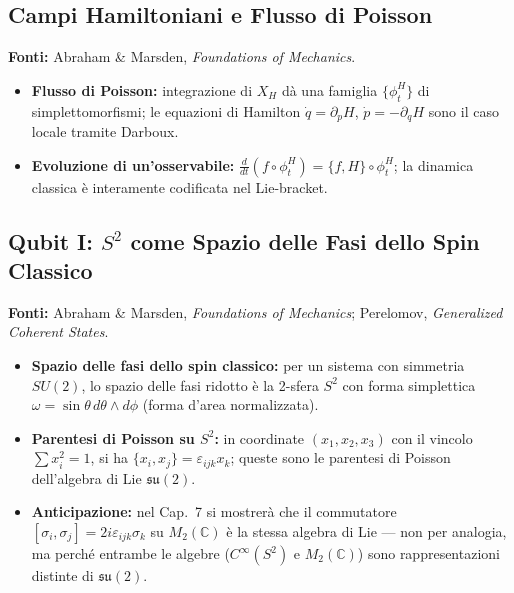 \documentclass[12pt, a4paper]{article}
\newcommand{\fonti}[1]{%
	\begin{fontebox}
		\textcolor{fontecolor}{\footnotesize\textbf{Fonti:} #1}
	\end{fontebox}%
}
\begin{document}
	\subsection{Campi Hamiltoniani e Flusso di Poisson}
	
	\fonti{Abraham \& Marsden, \textit{Foundations of Mechanics}.}
	
	\begin{itemize}
		\item \textbf{Flusso di Poisson:} integrazione di $X_H$ dà una famiglia $\{\phi_t^H\}$
		di simplettomorfismi; le equazioni di Hamilton $\dot{q} = \partial_p H$,
		$\dot{p} = -\partial_q H$ sono il caso locale tramite Darboux.
		\item \textbf{Evoluzione di un'osservabile:} $\frac{d}{dt}(f \circ \phi_t^H) =
		\{f, H\} \circ \phi_t^H$; la dinamica classica è interamente codificata nel
		Lie-bracket.
	\end{itemize}
	
	\subsection{Qubit I: $S^2$ come Spazio delle Fasi dello Spin Classico}
	\label{sec:qubit1}
	
	\fonti{Abraham \& Marsden, \textit{Foundations of Mechanics}; Perelomov,
		\textit{Generalized Coherent States}.}
	
	\begin{itemize}
		\item \textbf{Spazio delle fasi dello spin classico:} per un sistema con simmetria
		$SU(2)$, lo spazio delle fasi ridotto è la 2-sfera $S^2$ con forma simplettica
		$\omega = \sin\theta\, d\theta \wedge d\phi$ (forma d'area normalizzata).
		\item \textbf{Parentesi di Poisson su $S^2$:} in coordinate $(x_1, x_2, x_3)$
		con il vincolo $\sum x_i^2 = 1$, si ha $\{x_i, x_j\} = \varepsilon_{ijk} x_k$;
		queste sono le parentesi di Poisson dell'algebra di Lie $\mathfrak{su}(2)$.
		\item \textbf{Anticipazione:} nel Cap.\ 7 si mostrerà che il commutatore
		$[\sigma_i, \sigma_j] = 2i\varepsilon_{ijk}\sigma_k$ su $M_2(\mathbb{C})$ è la
		stessa algebra di Lie --- non per analogia, ma perché entrambe le algebre
		($C^\infty(S^2)$ e $M_2(\mathbb{C})$) sono rappresentazioni distinte di
		$\mathfrak{su}(2)$.
	\end{itemize}
	
\end{document}
